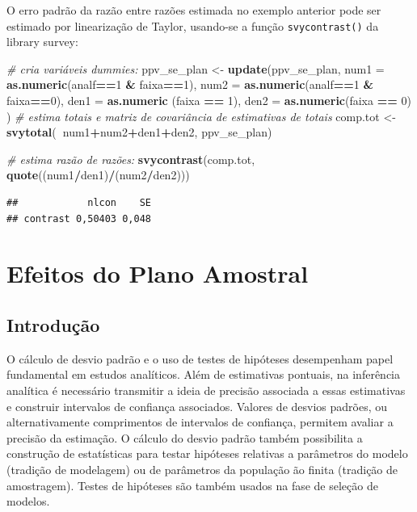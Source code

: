 \documentclass[]{book}
\newenvironment{Shaded}{\begin{snugshade}}{\end{snugshade}}
\newcommand{\KeywordTok}[1]{\textcolor[rgb]{0.13,0.29,0.53}{\textbf{#1}}}
\newcommand{\DataTypeTok}[1]{\textcolor[rgb]{0.13,0.29,0.53}{#1}}
\newcommand{\DecValTok}[1]{\textcolor[rgb]{0.00,0.00,0.81}{#1}}
\newcommand{\StringTok}[1]{\textcolor[rgb]{0.31,0.60,0.02}{#1}}
\newcommand{\CommentTok}[1]{\textcolor[rgb]{0.56,0.35,0.01}{\textit{#1}}}
\newcommand{\OperatorTok}[1]{\textcolor[rgb]{0.81,0.36,0.00}{\textbf{#1}}}
\newcommand{\NormalTok}[1]{#1}
\theoremstyle{definition}
\theoremstyle{definition}
\theoremstyle{definition}
\theoremstyle{remark}
\begin{document}
O erro padrão da razão entre razões estimada no exemplo anterior pode
ser estimado por linearização de Taylor, usando-se a função
\texttt{svycontrast()} da library survey:

\begin{Shaded}
\begin{Highlighting}[]
\CommentTok{# cria variáveis dummies: }
\NormalTok{ppv_se_plan <-}\StringTok{ }\KeywordTok{update}\NormalTok{(ppv_se_plan,}
\DataTypeTok{num1 =} \KeywordTok{as.numeric}\NormalTok{(analf}\OperatorTok{==}\DecValTok{1} \OperatorTok{&}\StringTok{ }\NormalTok{faixa}\OperatorTok{==}\DecValTok{1}\NormalTok{),}
\DataTypeTok{num2 =} \KeywordTok{as.numeric}\NormalTok{(analf}\OperatorTok{==}\DecValTok{1} \OperatorTok{&}\StringTok{ }\NormalTok{faixa}\OperatorTok{==}\DecValTok{0}\NormalTok{),}
\DataTypeTok{den1 =} \KeywordTok{as.numeric}\NormalTok{ (faixa }\OperatorTok{==}\StringTok{ }\DecValTok{1}\NormalTok{),}
\DataTypeTok{den2 =} \KeywordTok{as.numeric}\NormalTok{(faixa }\OperatorTok{==}\StringTok{ }\DecValTok{0}\NormalTok{)}
\NormalTok{)}
\CommentTok{# estima totais e matriz de covariância de estimativas de totais}
\NormalTok{comp.tot <-}\StringTok{ }\KeywordTok{svytotal}\NormalTok{(}\OperatorTok{~}\NormalTok{num1}\OperatorTok{+}\NormalTok{num2}\OperatorTok{+}\NormalTok{den1}\OperatorTok{+}\NormalTok{den2, ppv_se_plan)  }

\CommentTok{# estima razão de razões:  }
\KeywordTok{svycontrast}\NormalTok{(comp.tot, }\KeywordTok{quote}\NormalTok{((num1}\OperatorTok{/}\NormalTok{den1)}\OperatorTok{/}\NormalTok{(num2}\OperatorTok{/}\NormalTok{den2)))  }
\end{Highlighting}
\end{Shaded}

\begin{verbatim}
##            nlcon    SE
## contrast 0,50403 0,048
\end{verbatim}

\chapter{Efeitos do Plano Amostral}\label{epa}

\section{Introdução}\label{introducao}

O cálculo de desvio padrão e o uso de testes de hipóteses desempenham
papel fundamental em estudos analíticos. Além de estimativas pontuais,
na inferência analítica é necessário transmitir a ideia de precisão
associada a essas estimativas e construir intervalos de confiança
associados. Valores de desvios padrões, ou alternativamente comprimentos
de intervalos de confiança, permitem avaliar a precisão da estimação. O
cálculo do desvio padrão também possibilita a construção de estatísticas
para testar hipóteses relativas a parâmetros do modelo (tradição de
modelagem) ou de parâmetros da população ão finita (tradição de
amostragem). Testes de hipóteses são também usados na fase de seleção de
modelos.
\end{document}
